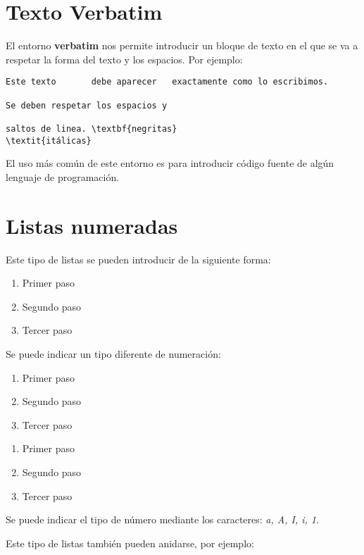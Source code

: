\documentclass[letterpaper,12pt]{article}
\begin{document}
\section{Texto Verbatim}

El entorno \textbf{verbatim} nos permite introducir un bloque de texto en el que se va a respetar la forma del texto y los espacios. Por ejemplo:

\begin{verbatim}
Este texto       debe aparecer   exactamente como lo escribimos.

Se deben respetar los espacios y

saltos de linea. \textbf{negritas} 
\textit{itálicas}
\end{verbatim}

El uso más común de este entorno es para introducir código fuente de algún lenguaje de programación.

\section{Listas numeradas}

Este tipo de listas se pueden introducir de la siguiente forma:

\begin{enumerate}
	\item Primer paso
	\item Segundo paso
	\item Tercer paso
\end{enumerate}

Se puede indicar un tipo diferente de numeración:

\begin{enumerate}[I]
	\item Primer paso
	\item Segundo paso
	\item Tercer paso
\end{enumerate}

\bigskip

\begin{enumerate}[a]
	\item Primer paso
	\item Segundo paso
	\item Tercer paso
\end{enumerate}

Se puede indicar el tipo de número mediante los caracteres: \textit{a, A, I, i, 1}.

Este tipo de listas también pueden anidarse, por ejemplo:
\end{document}
